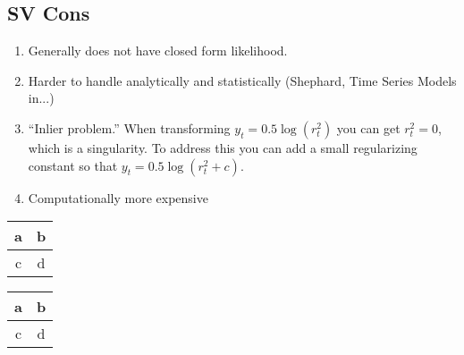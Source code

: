 \documentclass{article}
\begin{document}
\subsection{SV Cons}
\begin{enumerate}
\item Generally does not have closed form likelihood.
\item Harder to handle analytically and statistically (Shephard, Time Series Models in...)
\item ``Inlier problem.'' When transforming $y_t = 0.5 \log(r^2_t)$ you can get $r^2_t = 0$, which is a singularity.  To address this you can add a small regularizing constant so that $y_t = 0.5 \log(r_t^2 + c)$.
\item Computationally more expensive
\end{enumerate}

\begin{tabular}{c | c}
a & b \\
\hline
c & d \\
\end{tabular}
\begin{tabular}{c | c}
a & b \\
\hline
c & d \\
\end{tabular}
\end{document}
